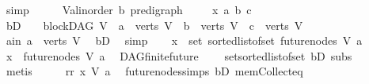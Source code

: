 \begin{isabellebody}
\ simp\isanewline
{}\isamarkupfalse%
\ \isanewline
\ \ \isamarkupfalse%
\ V{\isacharcolon}{\kern0pt}{\isacharcolon}{\kern0pt}{\isachardoublequoteopen}{\isacharparenleft}{\kern0pt}{\isacharprime}{\kern0pt}a{\isacharcolon}{\kern0pt}{\isacharcolon}{\kern0pt}linorder{\isacharcomma}{\kern0pt}\ {\isacharprime}{\kern0pt}b{\isacharparenright}{\kern0pt}\ pre{\isacharunderscore}{\kern0pt}digraph{\isachardoublequoteclose}\ \isanewline
\ \ \isamarkupfalse%
\ x\ a\ b\ c\isanewline
\ \ \isamarkupfalse%
\ bD{\isacharcolon}{\kern0pt}\ {\isachardoublequoteopen}\ {\isasymnot}\ {\isacharparenleft}{\kern0pt}{\isasymnot}\ blockDAG\ V\ {\isasymor}\ a\ {\isasymnotin}\ verts\ V\ {\isasymor}\ b\ {\isasymnotin}\ verts\ V\ {\isasymor}\ c\ {\isasymnotin}\ verts\ V{\isacharparenright}{\kern0pt}{\isachardoublequoteclose}\isanewline
\ \ \isamarkupfalse%
\ \isamarkupfalse%
\ a{\isacharunderscore}{\kern0pt}in{\isacharcolon}{\kern0pt}\ {\isachardoublequoteopen}a\ {\isasymin}\ verts\ V{\isachardoublequoteclose}\ \isamarkupfalse%
\ bD\ \isamarkupfalse%
\ simp\isanewline
\ \ \isamarkupfalse%
\ {\isachardoublequoteopen}x\ {\isasymin}\ set\ {\isacharparenleft}{\kern0pt}sorted{\isacharunderscore}{\kern0pt}list{\isacharunderscore}{\kern0pt}of{\isacharunderscore}{\kern0pt}set\ {\isacharparenleft}{\kern0pt}future{\isacharunderscore}{\kern0pt}nodes\ V\ a{\isacharparenright}{\kern0pt}{\isacharparenright}{\kern0pt}{\isachardoublequoteclose}\isanewline
\ \ \isamarkupfalse%
\ \isamarkupfalse%
\ {\isachardoublequoteopen}x\ {\isasymin}\ future{\isacharunderscore}{\kern0pt}nodes\ V\ a{\isachardoublequoteclose}\ \isamarkupfalse%
\ DAG{\isachardot}{\kern0pt}finite{\isacharunderscore}{\kern0pt}future\isanewline
\ \ \ \ set{\isacharunderscore}{\kern0pt}sorted{\isacharunderscore}{\kern0pt}list{\isacharunderscore}{\kern0pt}of{\isacharunderscore}{\kern0pt}set\ bD\ subs\isanewline
\ \ \ \ \isamarkupfalse%
\ metis\isanewline
\ \ \isamarkupfalse%
\ \isamarkupfalse%
\ rr{\isacharcolon}{\kern0pt}\ {\isachardoublequoteopen}x\ {\isasymrightarrow}\isactrlsup {\isacharplus}{\kern0pt}\isactrlbsub V\isactrlesub \ a{\isachardoublequoteclose}\ \isamarkupfalse%
\ future{\isacharunderscore}{\kern0pt}nodes{\isachardot}{\kern0pt}simps\ bD\ mem{\isacharunderscore}{\kern0pt}Collect{\isacharunderscore}{\kern0pt}eq\isanewline
\ \ \ \ \isamarkupfalse%

\end{isabellebody}
